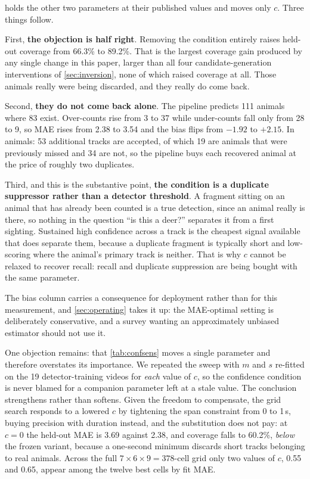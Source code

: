  holds the other two parameters at their published values and moves only
$c$. Three things follow.

First, \textbf{the objection is half right}. Removing the condition entirely raises held-out
coverage from 66.3\% to 89.2\%. That is the largest coverage gain produced by any single
change in this paper, larger than all four candidate-generation interventions of
\cref{sec:inversion}, none of which raised coverage at all. Those animals really were being
discarded, and they really do come back.

Second, \textbf{they do not come back alone}. The pipeline predicts 111 animals where 83
exist. Over-counts rise from 3 to 37 while under-counts fall only from 28 to 9, so MAE rises from 2.38 to 3.54 and the bias flips from $-1.92$ to $+2.15$. In animals: 53
additional tracks are accepted, of which 19 are animals that were previously missed and 34
are not, so the pipeline buys each recovered animal at the price of roughly two duplicates.

Third, and this is the substantive point, \textbf{the condition is a duplicate suppressor
rather than a detector threshold}. A fragment sitting on an animal that has already been
counted is a true detection, since an animal really is there, so nothing in the question
``is this a deer?'' separates it from a first sighting. Sustained high confidence across a
track is the cheapest signal available that does separate them, because a duplicate fragment is typically short and low-scoring where the animal's primary track is neither. That is
why $c$ cannot be relaxed to recover recall: recall and duplicate suppression are being
bought with the same parameter.

The bias column carries a consequence for deployment rather than for this measurement, and
\cref{sec:operating} takes it up: the MAE-optimal setting is deliberately conservative, and a
survey wanting an approximately unbiased estimator should not use it.

One objection remains: that \cref{tab:confsens} moves a single parameter and therefore
overstates its importance. We repeated the sweep with $m$ and $s$ re-fitted on the 19
detector-training videos for \emph{each} value of $c$, so the confidence condition is never
blamed for a companion parameter left at a stale value. The conclusion strengthens rather
than softens. Given the freedom to compensate, the grid search responds to a lowered $c$ by
tightening the span constraint from 0 to 1\,s, buying precision with duration instead, and the substitution does not pay: at $c=0$ the held-out MAE is 3.69 against 2.38, and
coverage falls to 60.2\%, \emph{below} the frozen variant, because a one-second minimum
discards short tracks belonging to real animals. Across the full $7\times6\times9=378$-cell
grid only two values of $c$, 0.55 and 0.65, appear among the twelve best cells by fit MAE.

